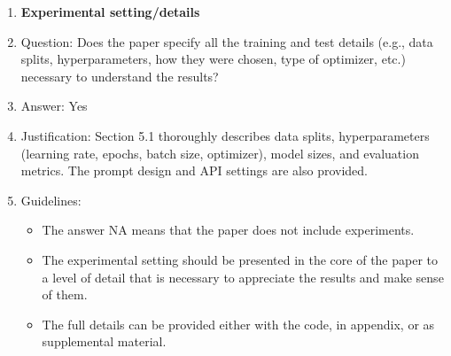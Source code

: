 \documentclass{article}
\newcommand{\answerYes}[1][]{Yes}
\begin{document}
\begin{enumerate}
\item {\bf Experimental setting/details}
    \item[] Question: Does the paper specify all the training and test details (e.g., data splits, hyperparameters, how they were chosen, type of optimizer, etc.) necessary to understand the results?
    \item[] Answer: \answerYes{}
    \item[] Justification: Section 5.1 thoroughly describes data splits, hyperparameters (learning rate, epochs, batch size, optimizer), model sizes, and evaluation metrics. The prompt design and API settings are also provided.
    \item[] Guidelines:
    \begin{itemize}
        \item The answer NA means that the paper does not include experiments.
        \item The experimental setting should be presented in the core of the paper to a level of detail that is necessary to appreciate the results and make sense of them.
        \item The full details can be provided either with the code, in appendix, or as supplemental material.
    \end{itemize}


\end{enumerate}
\end{document}
